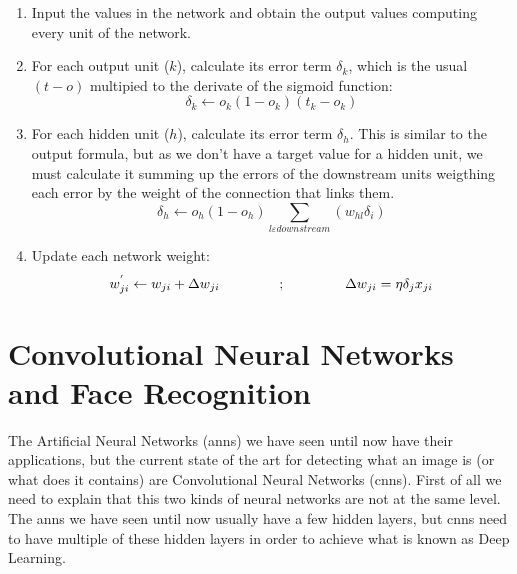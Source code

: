 		\begin{enumerate}
			\item Input the values in the network and obtain the output values computing every unit of the network.
			\item For each output unit ($k$), calculate its error term $\delta_k$, which is the usual $(t-o)$ multipied to the derivate of the sigmoid function:
				\begin{equation}
					\label{backpropagation_output_error}
					\delta_k \leftarrow o_k (1 - o_k)(t_k - o_k)
				\end{equation}				

			\item For each hidden unit ($h$), calculate its error term $\delta_h$. This is similar to the output formula, but as we don't have a target value for a hidden unit, we must calculate it summing up the errors of the downstream units weigthing each error by the weight of the connection that links them. 
				\begin{equation}
					\label{backpropagation_hidden_error}
					\delta_h \leftarrow o_h (1 - o_h) \sum_{l \varepsilon downstream} (w_{hl} \delta_i)
				\end{equation}

			\item Update each network weight:
				\begin{equation}
					\label{backpropagation_weight_update}
					w^{'}_{ji} \leftarrow w_{ji} + \Delta w_{ji} \hspace{1.5cm} ; \hspace{1.5cm} \Delta w_{ji} = \eta \delta_j x_{ji}
				\end{equation}
		\end{enumerate} 


\section{Convolutional Neural Networks and Face Recognition}
The Artificial Neural Networks (\glspl{ann}) we have seen until now have their applications, but the current state of the art for detecting what an image is (or what does it contains) are Convolutional Neural Networks (\glspl{cnn}). First of all we need to explain that this two kinds of neural networks are not at the same level. The \glspl{ann} we have seen until now usually have a few hidden layers, but \glspl{cnn} need to have multiple of these hidden layers in order to achieve what is known as Deep Learning. 

